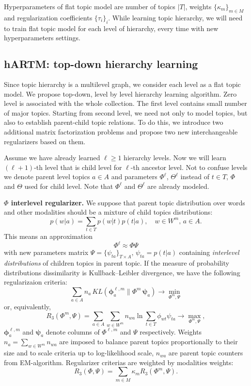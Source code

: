 \documentclass[12pt, twoside]{article}
\begin{document}
\vspace{0.5cm}
Hyperparameters of flat topic model are number of topics $|T|$, weights $\{\kappa_m\}_{m \in M}$ and regularization coefficients $\{\tau_i\}_{i}$. While learning topic hierarchy, we will need to train flat topic model for each level of hierarchy, every time with new hyperparameters settings.

\subsection{hARTM: top-down hierarchy learning}
Since topic hierarchy is a multilevel graph, we consider each level as a flat topic model. We propose top-down, level by level hierarchy learning algorithm. Zero level is associated with the whole collection. The first level contains small number of major topics. Starting from second level, we need not only to model topics, but also to establish parent-child topic relations. To do this, we introduce two additional matrix factorization problems and propose two new interchangeable regularizers based on them. 

Assume we have already learned $\ell \geqslant 1$ hierarchy levels. Now we will learn $(\ell+1)$-th level that is child level for $\ell$-th ancestor level. Not to confuse levels we denote parent level topics $a \in A$ and parameters $\Phi^\ell$, $\Theta^\ell$ instead of $t \in T$, $\Phi$ and $\Theta$ used for child level. Note that $\Phi^\ell$ and $\Theta^\ell$ are already modeled.

\textbf{$\Phi$ interlevel regularizer.}
We suppose that parent topic distribution over words and other modalities should be a mixture of child topics distributions:
\[
p(w|a) = \sum_{t \in T} p(w|t) p(t|a), \quad w \in W^m, \, a \in A.
\] 
This means an approximation 
\begin{equation}
\label{phi_approximation}
\Phi^\ell \approx \Phi \Psi
\end{equation}
 with new parameters matrix $\Psi = \{\psi_{ta}\}_{T \times A}$, $\psi_{ta} = p(t|a)$ containing \emph{interlevel distributions} of children topics in parent topic. If the measure of probability distributions dissimilarity is Kullback–Leibler divergence, we have the following regularizaion criteria:
\begin{equation}
\label{phi_regularizer}
\nonumber
 \sum_{a \in A} n_a \, KL(\bm \phi^{\ell, m}_a \| \Phi^m \, \bm \psi_a)  \rightarrow \min_{\Phi^m, \Psi}
\end{equation}
or, equivalently,
\[
R_3(\Phi^m, \Psi) = \sum_{a \in A} \sum_{w \in W^m} n_{wa} \ln \sum_{t \in T} \phi_{wt} \psi_{ta} \rightarrow \max_{\Phi^m, \Psi},
\]
$\bm \phi^{\ell, m}_a$ and $\bm \psi_a$ denote columns of $\Phi^{\ell, m}$ and $\Psi$ respectively. Weights $n_a = \sum_{w \in W^m} n_{wa}$ are imposed to balance parent topics proportionally to their size and to scale criteria up to log-likelihood scale, $n_{wa}$ are parent topic counters from EM-algorithm.
Regularizer criterias are weighted by modalities weights: 
\[
R_3(\Phi, \Psi) = \sum_{m \in M} \kappa_m R_3(\Phi^m, \Psi).
\]
\end{document}
